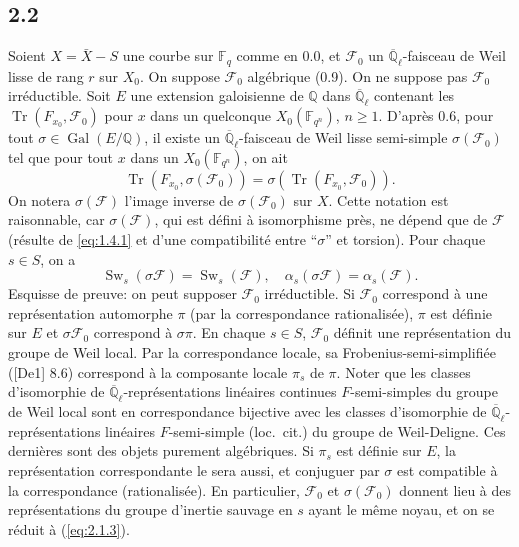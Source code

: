 \documentclass[10pt,a4paper]{article}
\theoremstyle{plain}
\theoremstyle{definition}
\DeclareMathOperator{\Gal}{Gal}
\DeclareMathOperator{\Sw}{Sw}
\DeclareMathOperator{\tr}{Tr}
\begin{document}
\subsection*{2.2}

Soient $X = \bar{X} - S$ une courbe sur $\mathbb{F}_q$ comme en 0.0, et $\mathcal{F}_0$ un $\overline{\mathbb{Q}}_\ell$-faisceau de Weil lisse de rang $r$ sur $X_0$. On suppose $\mathcal{F}_0$ alg\'ebrique (0.9). On ne suppose pas $\mathcal{F}_0$ irr\'eductible. Soit $E$ une extension galoisienne de $\mathbb{Q}$ dans $\overline{\mathbb{Q}}_\ell$ contenant les $\tr(F_{x_0}, \mathcal{F}_0)$ pour $x$ dans un quelconque $X_0(\mathbb{F}_{q^n})$, $n \geq 1$. D'apr\`es 0.6, pour tout $\sigma \in \Gal(E/\mathbb{Q})$, il existe un $\overline{\mathbb{Q}}_\ell$-faisceau de Weil lisse semi-simple $\sigma(\mathcal{F}_0)$ tel que pour tout $x$ dans un $X_0(\mathbb{F}_{q^n})$, on ait
\[
\tr(F_{x_0}, \sigma(\mathcal{F}_0)) = \sigma(\tr(F_{x_0}, \mathcal{F}_0)).
\]
On notera $\sigma(\mathcal{F})$ l'image inverse de $\sigma(\mathcal{F}_0)$ sur $X$. Cette notation est raisonnable, car $\sigma(\mathcal{F})$, qui est d\'efini \`a isomorphisme pr\`es, ne d\'epend que de $\mathcal{F}$ (r\'esulte de \ref{eq:1.4.1} et d'une compatibilit\'e entre ``$\sigma$'' et torsion). Pour chaque $s \in S$, on a
\begin{equation}\label{eq:2.2.1}
\Sw_s(\sigma \mathcal{F}) = \Sw_s(\mathcal{F}), \quad \alpha_s(\sigma \mathcal{F}) = \alpha_s(\mathcal{F}).
\end{equation}
Esquisse de preuve: on peut supposer $\mathcal{F}_0$ irr\'eductible. Si $\mathcal{F}_0$ correspond \`a une repr\'esentation automorphe $\pi$ (par la correspondance rationalis\'ee), $\pi$ est d\'efinie sur $E$ et $\sigma \mathcal{F}_0$ correspond \`a $\sigma \pi$. En chaque $s \in S$, $\mathcal{F}_0$ d\'efinit une repr\'esentation du groupe de Weil local. Par la correspondance locale, sa Frobenius-semi-simplifi\'ee ([De1] 8.6) correspond \`a la composante locale $\pi_s$ de $\pi$. Noter que les classes d'isomorphie de $\overline{\mathbb{Q}}_\ell$-repr\'esentations lin\'eaires continues $F$-semi-simples du groupe de Weil local sont en correspondance bijective avec les classes d'isomorphie de $\overline{\mathbb{Q}}_\ell$-repr\'esentations lin\'eaires $F$-semi-simple (loc.~cit.) du groupe de Weil-Deligne. Ces derni\`eres sont des objets purement alg\'ebriques. Si $\pi_s$ est d\'efinie sur $E$, la repr\'esentation correspondante le sera aussi, et conjuguer par $\sigma$ est compatible \`a la correspondance (rationalis\'ee). En particulier, $\mathcal{F}_0$ et $\sigma(\mathcal{F}_0)$ donnent lieu \`a des repr\'esentations du groupe d'inertie sauvage en $s$ ayant le m\^eme noyau, et on se r\'eduit \`a (\ref{eq:2.1.3}).
\end{document}
